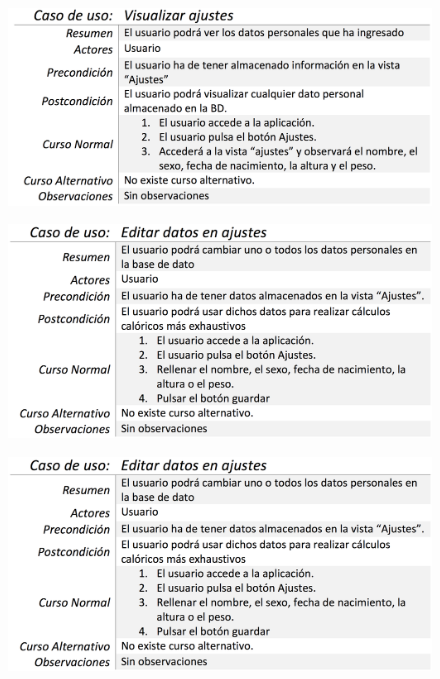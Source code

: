 \documentclass[a4paper, 11pt]{article}
\begin{document}
\begin{itemize}
            \begin{figure}[H]
              \centering
              \includegraphics[width=1\textwidth]{visualizar-ajustes}
            \end{figure}

            \begin{figure}[H]
              \centering
              \includegraphics[width=1\textwidth]{editar-datos-en-ajustes}
            \end{figure}
            \begin{figure}[H]
              \centering
              \includegraphics[width=1\textwidth]{editar-datos-en-ajustes}
            \end{figure}



\end{itemize}
\end{document}

